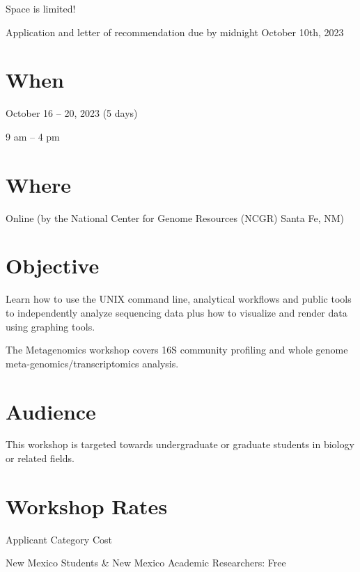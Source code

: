 \documentclass[
]{book}
\begin{document}
Space is limited!

Application and letter of recommendation due by midnight October 10th, 2023

\hypertarget{when-3}{%
\section*{When}\label{when-3}}

October 16 -- 20, 2023 (5 days)

9 am -- 4 pm

\hypertarget{where-3}{%
\section*{Where}\label{where-3}}

Online (by the National Center for Genome Resources (NCGR) Santa Fe, NM)

\hypertarget{objective-3}{%
\section*{Objective}\label{objective-3}}

Learn how to use the UNIX command line, analytical workflows and public tools to independently analyze sequencing data plus how to visualize and render data using graphing tools.

The Metagenomics workshop covers 16S community profiling and whole genome meta-genomics/transcriptomics analysis.

\hypertarget{audience-3}{%
\section*{Audience}\label{audience-3}}

This workshop is targeted towards undergraduate or graduate students in biology or related fields.

\hypertarget{workshop-rates-3}{%
\section*{Workshop Rates}\label{workshop-rates-3}}

Applicant Category Cost

New Mexico Students \& New Mexico Academic Researchers:
Free
\end{document}
